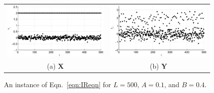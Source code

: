 \begin{figure}[ht]
\begin{tabular}{cc}
\includegraphics[scale=0.48]{NoisyResponseExample_X.eps} & \includegraphics[scale=0.48]{NoisyResponseExample_Y.eps} \\
(a) $\mathbf{X}$ & (b) $\mathbf{Y}$
\end{tabular}
\caption{An instance of Eqn.\ \ref{eqn:IReqn} for $L=500$, $A=0.1$, and $B=0.4$.}
\label{fig:IRxyplot}
\end{figure}

